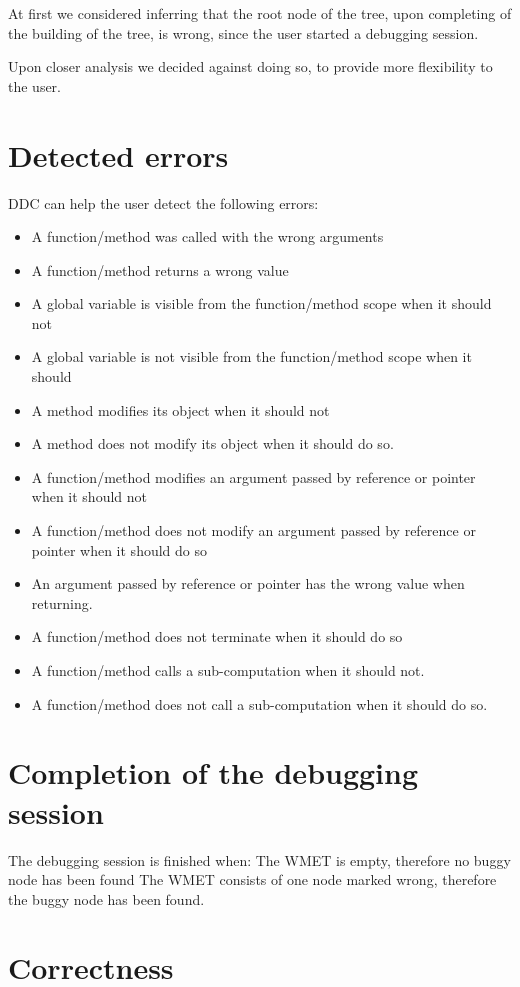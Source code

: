 At first we considered inferring that the root node of the tree, upon completing of the building of the tree, is wrong, since the user started a debugging session.

Upon closer analysis we decided against doing so, to provide more flexibility to the user.
\section{Detected errors}
DDC can help the user detect the following errors:
\begin{itemize}
\item A function/method was called with the wrong arguments
\item A function/method returns a wrong value
\item A global variable is visible from the function/method scope when it should not 
\item A global variable is not visible from the function/method scope when it should 
\item A method modifies its object when it should not 
\item A method does not modify its object when it should do so.
\item A function/method modifies an argument passed by reference or pointer when it should not 
\item A function/method does not modify an argument passed by reference or pointer when it should do so
\item An argument passed by reference or pointer has the wrong value when returning.
\item A function/method does not terminate when it should do so
\item A function/method calls a sub-computation when it should not.
\item A function/method does not call a sub-computation when it should do so.
\end{itemize}
\section{Completion of the debugging session}
The debugging session is finished when:
The WMET is empty, therefore no buggy node has been found
The WMET consists of one node marked wrong, therefore the buggy node has been found.
\section{Correctness}